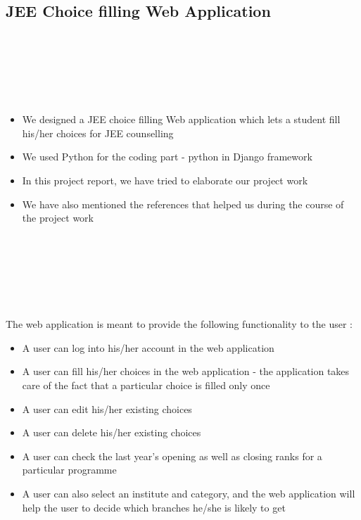 \documentclass{article}
\begin{document}
\begin{center}
\section*{JEE Choice filling Web Application}
\end{center}
\hspace*{5 mm} \\
\hspace*{5 mm} \\
\hspace*{5 mm} \\
\hspace*{5 mm} \\
\hspace*{5 mm}{\LARGE DJANGO - A Completely new Experience!}
\hspace*{5 mm} \\
\begin{itemize}
  \item We designed a JEE choice filling Web application which lets a student fill his/her choices for JEE counselling
  \item We used Python for the coding part - python in Django framework
  \item In this project report, we have tried to elaborate our project work
  \item We have also mentioned the references that helped us during the course of the project work
\end{itemize}
\hspace*{5 mm} \\
\hspace*{5 mm} \\
\hspace*{5 mm} \\
\hspace*{5 mm} \\
\hspace*{5 mm}{\LARGE Features of the web application : }
\hspace*{5 mm} \\
\hspace*{5 mm} \\
\hspace*{5 mm} The web application is meant to provide the following functionality to the user : \\
\begin{itemize}
  \item A user can log into his/her account in the web application
  \item A user can fill his/her choices in the web application - the application takes care of the fact that a particular choice is filled only once
  \item A user can edit his/her existing choices
  \item A user can delete his/her existing choices
  \item A user can check the last year's opening as well as closing ranks for a particular programme
  \item A user can also select an institute and category, and the web application will help the user to decide which branches he/she is likely to get
\end{itemize}
\end{document}
